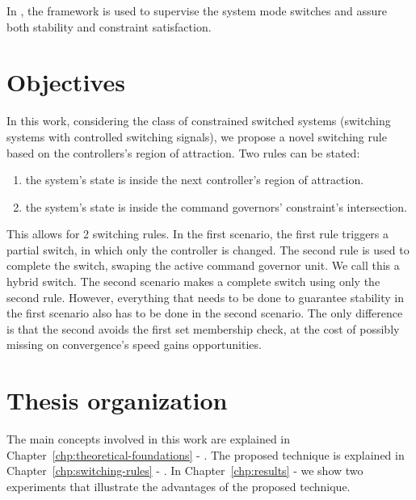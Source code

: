 In \parencite{franzè.lucia.ea:command,lucia.franzè:stabilization}, the \CG{}
framework is used to supervise the system mode switches and assure both
stability and constraint satisfaction.

\section{Objectives}%
\label{sec:objectives}

In this work, considering the class of constrained switched systems (switching
systems with controlled switching signals), we propose a novel switching rule
based on the controllers's region of attraction. Two rules can be stated:

\begin{enumerate}
  \item the system's state is inside the next controller's region of attraction.
  \item the system's state is inside the command governors' constraint's
        intersection.
\end{enumerate}

This allows for 2 switching rules. In the first scenario, the first rule
triggers a partial switch, in which only the controller is changed. The second
rule is used to complete the switch, swaping the active command governor unit.
We call this a hybrid switch. The second scenario makes a complete switch using
only the second rule. However, everything that needs to be done to guarantee
stability in the first scenario also has to be done in the second scenario. The
only difference is that the second avoids the first set membership check, at the
cost of possibly missing on convergence's speed gains opportunities.

\section{Thesis organization}%
\label{sec:organization}

The main concepts involved in this work are explained in
Chapter~\ref{chp:theoretical-foundations} -
. The proposed technique is explained in
Chapter~\ref{chp:switching-rules} - . In
Chapter~\ref{chp:results} -  we show two experiments that
illustrate the advantages of the proposed technique.
